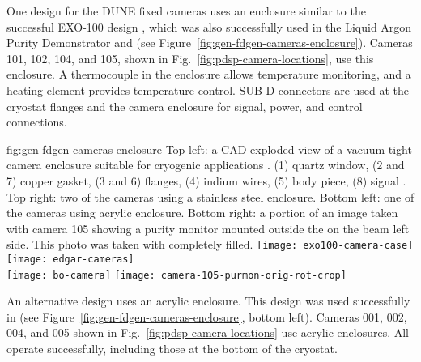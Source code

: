 One design for the DUNE fixed cameras uses an enclosure similar to
the successful EXO-100 design \cite{Delaquis:2013hva}, which was also
successfully used in the Liquid Argon Purity Demonstrator
and  (see Figure~\ref{fig:gen-fdgen-cameras-enclosure}). Cameras 101, 102, 104, and 105, shown in Fig.~\ref{fig:pdsp-camera-locations}, use this enclosure.
A thermocouple in the enclosure allows temperature monitoring, and a heating element provides temperature control.  
SUB-D connectors are used at the cryostat flanges and the camera enclosure for signal, power, and control connections.

\begin{dunefigure}{fig:gen-fdgen-cameras-enclosure}
  {Top left: a CAD exploded view of a vacuum-tight camera enclosure suitable for cryogenic applications \cite{Delaquis:2013hva}.
    (1) quartz window, (2 and 7) copper gasket, (3 and 6) flanges, (4) indium wires, (5) body piece, (8) signal \fdth.
    Top right: two of the  cameras using a stainless steel enclosure. 
    Bottom left: one of the  cameras using acrylic enclosure.
    Bottom right: a portion of an image taken with  camera 105 showing a purity monitor mounted outside the  on the beam left side. This photo was taken with  completely filled.
  }
  \texttt{[image: exo100-camera-case]}%
  \texttt{[image: edgar-cameras]}\\
  \hfill \texttt{[image: bo-camera]}%
  \hfill \texttt{[image: camera-105-purmon-orig-rot-crop]}%
  \hfill
\end{dunefigure}

An alternative design uses an acrylic enclosure.
This design was used successfully in  (see Figure~\ref{fig:gen-fdgen-cameras-enclosure}, bottom left). Cameras 001, 002, 004, and 005 shown in Fig.~\ref{fig:pdsp-camera-locations} use acrylic enclosures. 
All operate successfully, including those at the bottom of the cryostat.


